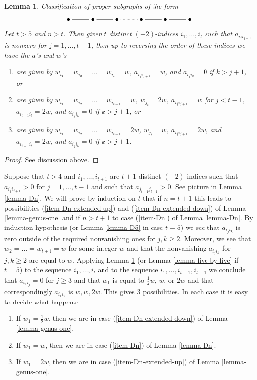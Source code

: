 \documentclass{stacks-project}
\theoremstyle{plain}
\newtheorem{lemma}[subsection]{Lemma}
\theoremstyle{definition}
\theoremstyle{remark}
\numberwithin{equation}{subsection}
\begin{document}
\begin{lemma}
\label{lemma-long}
Classification of proper subgraphs of the form
$$
\xymatrix{
\bullet \ar@{-}[r] &
\bullet \ar@{-}[r] &
\bullet \ar@{..}[r] &
\bullet \ar@{-}[r] &
\bullet \ar@{-}[r] &
\bullet
}
$$
Let $t > 5$ and $n > t$. Then given $t$ distinct $(-2)$-indices
$i_1, \ldots, i_t$ such that $a_{i_ji_{j + 1}}$ is nonzero for
$j = 1, \ldots, t - 1$, then up to reversing the order of these indices
we have the $a$'s and $w$'s
\begin{enumerate}
\item
\label{item-An}
are given by $w_{i_1} = w_{i_2} = \ldots = w_{i_t} = w$,
$a_{i_ji_{j + 1}} = w$, and $a_{i_ji_k} = 0$ if $k > j + 1$, or
\item
\label{item-Cn}
are given by $w_{i_1} = w_{i_2} = \ldots = w_{i_{t - 1}} = w$,
$w_{j_t} = 2w$, $a_{i_ji_{j + 1}} = w$ for $j < t - 1$,
$a_{i_{t - 1}i_t} = 2w$, and $a_{i_ji_k} = 0$ if $k > j + 1$, or
\item
\label{item-Bn}
are given by $w_{i_1} = w_{i_2} = \ldots = w_{i_{t - 1}} = 2w$,
$w_{j_t} = w$, $a_{i_ji_{j + 1}} = 2w$, and
$a_{i_{t - 1}i_t} = 2w$, and $a_{i_ji_k} = 0$ if $k > j + 1$.
\end{enumerate}
\end{lemma}

\begin{proof}
See discussion above.
\end{proof}

\noindent
Suppose that $t > 4$ and $i_1, \ldots, i_{t + 1}$ are $t + 1$
distinct $(-2)$-indices such that $a_{i_ji_{j + 1}} > 0$
for $j = 1, \ldots, t - 1$ and such that $a_{j_{t - 1}j_{t + 1}} > 0$.
See picture in Lemma \ref{lemma-Dn}. We will prove by induction on $t$
that if $n = t + 1$ this leads to possibilities
(\ref{item-Dn-extended-up}) and (\ref{item-Dn-extended-down})
of Lemma \ref{lemma-genus-one} and if $n > t + 1$ to
case (\ref{item-Dn}) of Lemma \ref{lemma-Dn}.
By induction hypothesis (or Lemma \ref{lemma-D5} in case $t = 5$)
we see that $a_{i_ji_k}$ is zero outside of the required
nonvanishing ones for $j, k \geq 2$.
Moreover, we see that $w_2 = \ldots = w_{t + 1} = w$ for some integer
$w$ and that the nonvanishing $a_{i_ji_k}$ for $j, k \geq 2$ are
equal to $w$. Applying Lemma \ref{lemma-long}
(or Lemma \ref{lemma-five-by-five} if $t = 5$) to the sequence
$i_1, \ldots, i_t$ and to the sequence
$i_1, \ldots, i_{t - 1}, i_{t + 1}$ we conclude that
$a_{i_1 i_j} = 0$ for $j \geq 3$ and that
$w_1$ is equal to $\frac{1}{2}w$, $w$, or $2w$
and that correspondingly $a_{i_1i_2}$ is $w, w, 2w$.
This gives $3$ possibilities. In each case it is easy to
decide what happens:
\begin{enumerate}
\item If $w_1 = \frac{1}{2}w$, then we are in case
(\ref{item-Dn-extended-down}) of Lemma \ref{lemma-genus-one}.
\item If $w_1 = w$, then we are in case
(\ref{item-Dn}) of Lemma \ref{lemma-Dn}.
\item If $w_1 = 2w$, then we are in case
(\ref{item-Dn-extended-up}) of Lemma \ref{lemma-genus-one}.
\end{enumerate}
\end{document}
